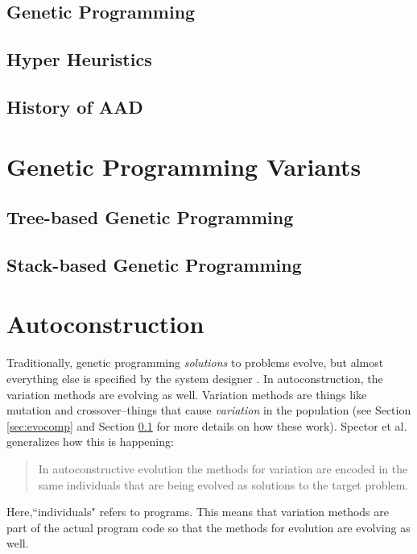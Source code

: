 \documentclass{sig-alternate}
\begin{document}
\subsection{Genetic Programming}
\label{sec:GP}

\subsection{Hyper Heuristics}
\label{sec:HH}

\subsection{History of AAD}
\label{sec:history}

\section{Genetic Programming Variants}
\label{sec:gpvariants}

\subsection{Tree-based Genetic Programming}
\label{sec:tgp}

\subsection{Stack-based Genetic Programming}
\label{sec:sgp}

\section{Autoconstruction}
\label{sec:ac}

Traditionally, genetic programming \textit{solutions} to problems evolve, but almost everything else is specified by the system designer \cite{spector:2016}. In autoconstruction, the variation methods are evolving as well. Variation methods are things like mutation and crossover--things that cause \textit{variation} in the population (see Section \ref{sec:evocomp} and Section \ref{sec:GP} for more details on how these work). Spector et al. generalizes how this is happening:
\begin{quotation}
	In autoconstructive evolution the methods for variation are encoded in the same individuals that are being evolved as solutions to the target problem.
\end{quotation}
Here,``individuals" refers to programs. This means that variation methods are part of the actual program code so that the methods for evolution are evolving as well. 
\end{document}
